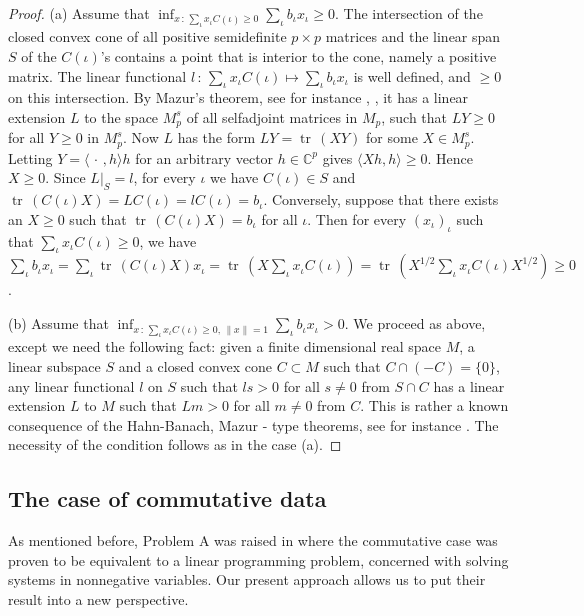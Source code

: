 \documentclass[12pt]{amsart}
\theoremstyle{definition}
\begin{document}
\begin{proof}
(a) Assume that $\inf_{x\, :\, \sum_\iota x_\iota C(\iota ) \geq 0}\sum_\iota b_\iota x_\iota \geq 0$. The intersection of the closed convex cone of all positive semidefinite $p\times p$ matrices and the linear span $S$ of the $C(\iota )$'s contains a point that is interior to the cone, namely a positive matrix. The linear functional $l\, :\, \sum_\iota x_\iota C(\iota ) \mapsto \sum_\iota b_\iota x_\iota$ is well defined, and $ \geq 0$ on this intersection. By Mazur's theorem, see for instance \cite{AliprantisTourky}, \cite{Kantorovich}, it has a linear extension $L$ to the space $M_{p}^s$ of all selfadjoint matrices in $M_p$, such that $LY\geq 0$ for all $Y\geq 0$ in $M_{p}^s$. Now $L$ has the form $LY={\operatorname{tr}}\, (XY) $ for some $X\in M_{p}^s$.  Letting $Y=\langle \,\cdot \, ,h\rangle h$ for an arbitrary vector $h\in \mathbb{C}^p$ gives $\langle Xh,h\rangle \geq 0$. Hence $X\geq 0$. Since  $L|_S =l$, for every $\iota $ we have $C(\iota ) \in S$ and ${\operatorname{tr}}\, (C(\iota ) X)=LC(\iota ) =l C(\iota ) =b_\iota $.
Conversely, suppose that  there exists an $X\geq 0$ such that ${\operatorname{tr}}\, (C(\iota ) X)=b_\iota $ for all $\iota$. Then for every $(x_\iota )_\iota$ such that $\sum_\iota x_\iota C(\iota ) \geq 0$, we have $\sum_\iota b_\iota x_\iota =\sum_\iota {\operatorname{tr}}\, (C(\iota ) X)x_\iota ={\operatorname{tr}}\, (X\sum_\iota x_\iota C(\iota ) )={\operatorname{tr}}\, (X^{1/2}\sum_\iota x_\iota C(\iota ) X^{1/2})\geq 0$.

(b) Assume that $\inf_{x\, :\, \sum_\iota x_\iota C(\iota ) \geq 0, \, \| x\| =1}\sum_\iota 
b_\iota x_\iota > 0$. We proceed as above, except we need the following fact: given 
a finite dimensional real space $M$, a linear subspace $S$ and a closed convex 
cone $C\subset M$ such that $C\cap (-C)=\{ 0\}$,   any linear functional $l$ on $S$ 
such that $ls>0$ for all $s\not =0$ from $S\cap C$ has a linear extension $L$ to $M$ 
such that $Lm>0$ for all $m\not =0$ from $C$.
This is rather a known consequence of the Hahn-Banach, Mazur - type theorems, 
see for instance \cite{rh}.  
The necessity of the condition follows as in the case (a). 
\end{proof}

\subsection{The case of commutative data}\label{ss:ccd}
As mentioned before, Problem A was raised in  \cite{LiPoon} where the  commutative 
case
was proven to be  equivalent   to a linear programming problem, concerned with 
solving systems in nonnegative  variables. Our present approach  allows us to put 
their result into a new perspective.
\end{document}

